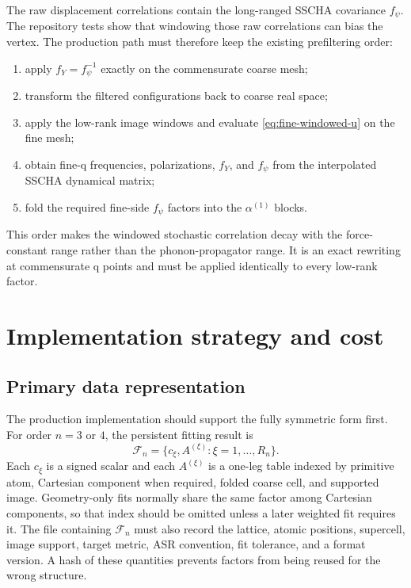 \documentclass{article}
\begin{document}
The raw displacement correlations contain the long-ranged SSCHA covariance
$f_\psi$. The repository tests show that windowing those raw correlations
can bias the vertex. The production path must therefore keep the existing
prefiltering order:
\begin{enumerate}
    \item apply $f_Y=f_\psi^{-1}$ exactly on the commensurate coarse mesh;
    \item transform the filtered configurations back to coarse real space;
    \item apply the low-rank image windows and evaluate
    \autoref{eq:fine-windowed-u} on the fine mesh;
    \item obtain fine-q frequencies, polarizations, $f_Y$, and $f_\psi$
    from the interpolated SSCHA dynamical matrix;
    \item fold the required fine-side $f_\psi$ factors into the
    $\alpha^{(1)}$ blocks.
\end{enumerate}
This order makes the windowed stochastic correlation decay with the
force-constant range rather than the phonon-propagator range. It is an
exact rewriting at commensurate q points and must be applied identically to
every low-rank factor.


\section{Implementation strategy and cost}
\label{sec:implementation}

\subsection{Primary data representation}
\label{sec:code-changes}

The production implementation should support the fully symmetric form
first. For order $n=3$ or $4$, the persistent fitting result is
\begin{equation}
    \mathcal F_n
    =
    \{c_\xi,A^{(\xi)}:\xi=1,\ldots,R_n\}.
    \label{eq:factor-data-product}
\end{equation}
Each $c_\xi$ is a signed scalar and each $A^{(\xi)}$ is a one-leg table
indexed by primitive atom, Cartesian component when required, folded
coarse cell, and supported image. Geometry-only fits normally share the
same factor among Cartesian components, so that index should be omitted
unless a later weighted fit requires it. The file containing
$\mathcal F_n$ must also record the lattice, atomic positions, supercell,
image support, target metric, ASR convention, fit tolerance, and a format
version. A hash of these quantities prevents factors from being reused for
the wrong structure.
\end{document}
